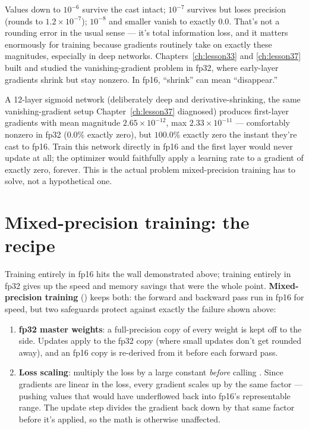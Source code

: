 Values down to $10^{-6}$ survive the cast intact; $10^{-7}$ survives but loses precision (rounds to $1.2\times10^{-7}$); $10^{-8}$ and smaller vanish to exactly $0.0$. That's not a rounding error in the usual sense --- it's total information loss, and it matters enormously for training because gradients routinely take on exactly these magnitudes, especially in deep networks. Chapters~\ref{ch:lesson33} and \ref{ch:lesson37} built and studied the vanishing-gradient problem in fp32, where early-layer gradients shrink but stay nonzero. In fp16, ``shrink'' can mean ``disappear.''

A 12-layer sigmoid network (deliberately deep and derivative-shrinking, the same vanishing-gradient setup Chapter~\ref{ch:lesson37} diagnosed) produces first-layer gradients with mean magnitude $2.65\times10^{-12}$, max $2.33\times10^{-11}$ --- comfortably nonzero in fp32 ($0.0\%$ exactly zero), but $100.0\%$ exactly zero the instant they're cast to fp16. Train this network directly in fp16 and the first layer would never update at all; the optimizer would faithfully apply a learning rate to a gradient of exactly zero, forever. This is the actual problem mixed-precision training has to solve, not a hypothetical one.

\section{Mixed-precision training: the recipe}

Training entirely in fp16 hits the wall demonstrated above; training entirely in fp32 gives up the speed and memory savings that were the whole point. \textbf{Mixed-precision training} () keeps both: the forward and backward pass run in fp16 for speed, but two safeguards protect against exactly the failure shown above:
\begin{enumerate}
  \item \textbf{fp32 master weights}: a full-precision copy of every weight is kept off to the side. Updates apply to the fp32 copy (where small updates don't get rounded away), and an fp16 copy is re-derived from it before each forward pass.
  \item \textbf{Loss scaling}: multiply the loss by a large constant \emph{before} calling . Since gradients are linear in the loss, every gradient scales up by the same factor --- pushing values that would have underflowed back into fp16's representable range. The update step divides the gradient back down by that same factor before it's applied, so the math is otherwise unaffected.
\end{enumerate}

